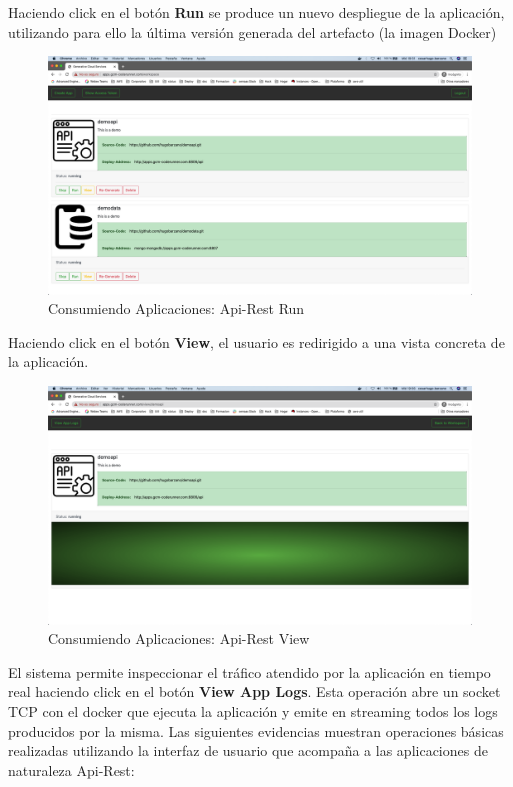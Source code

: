 \documentclass[a4paper,11pt]{book}
\begin{document}
Haciendo click en el botón \textbf{Run} se produce un nuevo despliegue de la aplicación, utilizando para ello la última versión generada del artefacto (la imagen Docker) 


\begin{figure}[H]
\centering
\includegraphics[scale=0.2]{imagenes/casouso/1_4.png}
\caption{ Consumiendo Aplicaciones: Api-Rest Run  }
\end{figure}


Haciendo click en el botón \textbf{View}, el usuario es redirigido a una vista concreta de la aplicación. 

\begin{figure}[H]
\centering
\includegraphics[scale=0.2]{imagenes/casouso/1_5.png}
\caption{ Consumiendo Aplicaciones: Api-Rest View   }
\end{figure}

El sistema permite inspeccionar el tráfico atendido por la aplicación en tiempo real haciendo click en el botón \textbf{View App Logs}. Esta operación abre un socket TCP con el docker que ejecuta la aplicación y emite en streaming todos los logs producidos por la misma. Las siguientes evidencias muestran operaciones básicas realizadas utilizando la interfaz de usuario que acompaña a las aplicaciones de naturaleza Api-Rest:
\end{document}
